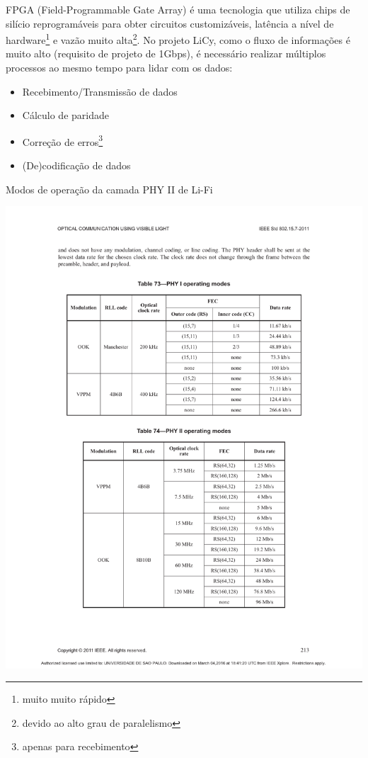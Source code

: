 	FPGA (Field-Programmable Gate Array) é uma tecnologia que utiliza chips de silício reprogramáveis para obter circuitos customizáveis, latência a nível de hardware\footnote{muito muito rápido} e vazão muito alta\footnote{devido ao alto grau de paralelismo}. No projeto LiCy, como o fluxo de informações é muito alto (requisito de projeto de 1Gbps), é necessário realizar múltiplos processos ao mesmo tempo para lidar com os dados:
	
	\begin{itemize}  
		\item Recebimento/Transmissão de dados
		\item Cálculo de paridade
		\item Correção de erros\footnote{apenas para recebimento}
		\item (De)codificação de dados
	\end{itemize}
	
	\begin{table}[htbp]
		\caption{\label{tab_phy2} Modos de operação da camada PHY II de Li-Fi}
		\centering
			\includegraphics[clip, trim=46.55mm 36.79mm 46.74mm 142.30mm,  width=1.00\textwidth]{pag213.pdf}
	\end{table}
	
